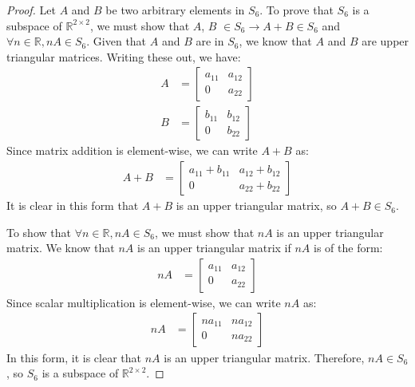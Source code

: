 \documentclass{article}
\begin{document}
\begin{proof}
Let \( A \) and \( B \) be two arbitrary elements in \( S_{6} \).
To prove that \( S_{6} \) is a subspace of \( \mathbb{R}^{2 \times 2} \), we must show that \( A \), \( B \) \( \in S_{6} \rightarrow A + B \in S_{6} \) and \( \forall n \in \mathbb{R}, nA \in S_{6} \).
Given that \( A \) and \( B \) are in \( S_{6} \), we know that \( A \) and \( B \) are upper triangular matrices.
Writing these out, we have:
\begin{align*} 
    A &= \begin{bmatrix} a_{11} & a_{12} \\ 0 & a_{22} \end{bmatrix} \\ 
    B &= \begin{bmatrix} b_{11} & b_{12} \\ 0 & b_{22} \end{bmatrix} 
\end{align*}
Since matrix addition is element-wise, we can write \( A + B \) as:
\begin{align*} 
    A + B &= \begin{bmatrix} a_{11} + b_{11} & a_{12} + b_{12} \\ 0 & a_{22} + b_{22} \end{bmatrix}
\end{align*}
It is clear in this form that \( A + B \) is an upper triangular matrix, so \( A + B \in S_{6} \).

To show that \( \forall n \in \mathbb{R}, nA \in S_{6} \), we must show that \( nA \) is an upper triangular matrix.
We know that \( nA \) is an upper triangular matrix if \( nA \) is of the form:
\begin{align*} 
    nA &= \begin{bmatrix} a_{11} & a_{12} \\ 0 & a_{22} \end{bmatrix}
\end{align*}
Since scalar multiplication is element-wise, we can write \( nA \) as:
\begin{align*} 
    nA &= \begin{bmatrix} na_{11} & na_{12} \\ 0 & na_{22} \end{bmatrix}
\end{align*}
In this form, it is clear that \( nA \) is an upper triangular matrix.
Therefore, \( nA \in S_{6} \), so \( S_{6} \) is a subspace of \( \mathbb{R}^{2 \times 2} \).
\end{proof}
    
\end{document}
